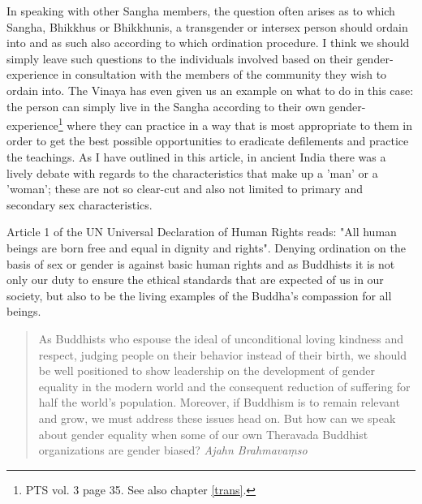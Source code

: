 In speaking with other Sangha members, the question often arises as to which Sangha, Bhikkhus or Bhikkhunis, a transgender or intersex person should ordain into and as such also according to which ordination procedure. I think we should simply leave such questions to the individuals involved based on their gender-experience in consultation with the members of the community they wish to ordain into. The Vinaya has even given us an example on what to do in this case: the person can simply live in the Sangha according to their own gender-experience\footnote{PTS vol. 3 page 35. See also chapter \ref{trans}.} where they can practice in a way that is most appropriate to them in order to get the best possible opportunities to eradicate defilements and practice the teachings. As I have outlined in this article, in ancient India there was a lively debate with regards to the characteristics that make up a 'man' or a 'woman'; these are not so clear-cut and also not limited to primary and secondary sex characteristics.

Article 1 of the UN Universal Declaration of Human Rights reads: "All human beings are born free and equal in dignity and rights". Denying ordination on the basis of sex or gender is against basic human rights and as Buddhists it is not only our duty to ensure the ethical standards that are expected of us in our society, but also to be the living examples of the Buddha's compassion for all beings.

\begin{quote}
As Buddhists who espouse the ideal of unconditional loving kindness and respect, judging people on their behavior instead of their birth, we should be well positioned to show leadership on the development of gender equality in the modern world and the consequent reduction of suffering for half the world’s population. Moreover, if Buddhism is to remain relevant and grow, we must address these issues head on. But how can we speak about gender equality when some of our own Theravada Buddhist organizations are gender biased? {\em Ajahn Brahmavaṃso}
\end{quote}
